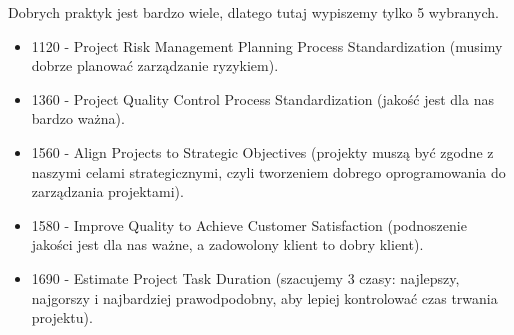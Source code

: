 Dobrych praktyk jest bardzo wiele, dlatego tutaj wypiszemy tylko 5 wybranych.
\begin{itemize}
\item 1120 - Project Risk Management Planning Process Standardization (musimy dobrze planować zarządzanie ryzykiem).
\item 1360 - Project Quality Control Process Standardization (jakość jest dla nas bardzo ważna).
\item 1560 - Align Projects to Strategic Objectives (projekty muszą być zgodne z naszymi celami strategicznymi, czyli tworzeniem dobrego oprogramowania do zarządzania projektami).
\item 1580 - Improve Quality to Achieve Customer Satisfaction (podnoszenie jakości jest dla nas ważne, a zadowolony klient to dobry klient).
\item 1690 - Estimate Project Task Duration (szacujemy 3 czasy: najlepszy, najgorszy i najbardziej prawodpodobny, aby lepiej kontrolować czas trwania projektu).
\end{itemize}

